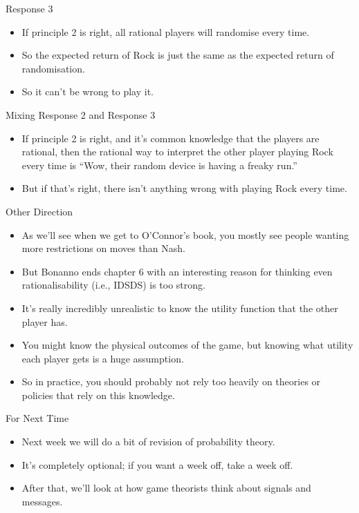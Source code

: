 \documentclass[
  ignorenonframetext,
]{beamer}
\providecommand{\tightlist}{%
  \setlength{\itemsep}{0pt}\setlength{\parskip}{0pt}}
\begin{document}
\begin{frame}{Response 3}
\protect\hypertarget{response-3}{}
\begin{itemize}
\tightlist
\item
  If principle 2 is right, all rational players will randomise every
  time.
\item
  So the expected return of Rock is just the same as the expected return
  of randomisation.
\item
  So it can't be wrong to play it.
\end{itemize}
\end{frame}

\begin{frame}{Mixing Response 2 and Response 3}
\protect\hypertarget{mixing-response-2-and-response-3}{}
\begin{itemize}
\tightlist
\item
  If principle 2 is right, and it's common knowledge that the players
  are rational, then the rational way to interpret the other player
  playing Rock every time is ``Wow, their random device is having a
  freaky run.''
\item
  But if that's right, there isn't anything wrong with playing Rock
  every time.
\end{itemize}
\end{frame}

\begin{frame}{Other Direction}
\protect\hypertarget{other-direction}{}
\begin{itemize}
\tightlist
\item
  As we'll see when we get to O'Connor's book, you mostly see people
  wanting more restrictions on moves than Nash.
\item
  But Bonanno ends chapter 6 with an interesting reason for thinking
  even rationalisability (i.e., IDSDS) is too strong. \pause
\item
  It's really incredibly unrealistic to know the utility function that
  the other player has.
\item
  You might know the physical outcomes of the game, but knowing what
  utility each player gets is a huge assumption.
\item
  So in practice, you should probably not rely too heavily on theories
  or policies that rely on this knowledge.
\end{itemize}
\end{frame}

\begin{frame}{For Next Time}
\protect\hypertarget{for-next-time}{}
\begin{itemize}
\tightlist
\item
  Next week we will do a bit of revision of probability theory.
\item
  It's completely optional; if you want a week off, take a week off.
\item
  After that, we'll look at how game theorists think about signals and
  messages.
\end{itemize}
\end{frame}
\end{document}
